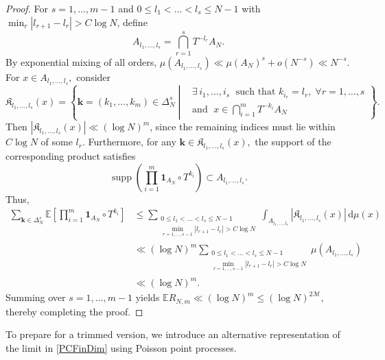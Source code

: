 \documentclass[11pt,twoside,a4paper,reqno]{amsart}
\newcommand{\supp}{\operatorname{supp}}
\renewcommand{\d}{\, \text{d}}
\newcommand{\E}{\mathbb{E}}
\def\one{{\mathbf{1}}}
\begin{document}
\begin{proof}
For $s = 1, \dots, m-1$ and $0\leq l_1 < \dots < l_s \leq N-1$ with $\min_r |l_{r+1}-l_r| > C\log N$, define
$$
A_{l_1,\dots,l_s} = \bigcap_{r=1}^s T^{-l_r} A_N.
$$
By exponential mixing of all orders, $\mu(A_{l_1,\dots,l_s})\ll
\mu(A_N)^s+o(N^{-s}) \ll N^{-s}$. For $x\in A_{l_1,\dots,l_s},$ consider
\begin{equation*}
\mathfrak{K}_{l_1,\dots,l_s}(x)=\left\{\mathbf{k}=(k_1,\dots,k_m)\in \Delta_N^s\;\left|
\begin{aligned}
&\exists\, i_1,\dots,i_s\; \text{ such that } k_{i_r}=l_r, \; \forall r=1,\dots,s \\
&\text{and }\; x\in \bigcap_{i=1}^m T^{-k_i} A_N
\end{aligned} \right\} \right. .
\end{equation*}
Then $|\mathfrak{K}_{l_1,\dots,l_s}(x)| \ll (\log N)^m$, since the remaining indices must lie within $C \log N$ of some $l_r$. Furthermore, for any $\mathbf{k} \in \mathfrak{K}_{l_1,\dots,l_s}(x),$ the support of the corresponding product satisfies
$$
\supp\left(\prod_{i=1}^{m} \one_{A_N}\circ T^{k_i}\right) \subset A_{l_1,\dots,l_s}.
$$
Thus,
\begin{align*}
\sum_{\mathbf{k} \in \Delta_N^s} \E \left[ \prod_{i=1}^m \one_{A_N} \circ T^{k_i} \right] & \leq
\sum_{\substack{0\leq l_1<\ldots<l_s\leq N-1\\ \min_{r=1,\ldots,s-1} |l_{r+1}-l_r|>C\log N}}
\int_{A_{l_1,\ldots,l_s}} |\mathfrak{K}_{l_1,\ldots,l_s}(x)| \d\mu(x)\\
& \ll (\log N)^m \sum_{\substack{0\leq l_1<\ldots<l_s\leq N-1\\ \min_{r=1,\ldots,s-1} |l_{r+1}-l_r|>C\log N}} \mu(A_{l_1,\ldots,l_s})\\
&\ll (\log N)^m.
\end{align*}
Summing over $s = 1, \dots, m-1$ yields $\E R_{N,m} \ll (\log N)^m \leq (\log N)^{2\mathcal{M}},$ thereby completing the proof.
\end{proof}




To prepare for a trimmed version, we introduce an alternative representation of the limit in \eqref{PCFinDim} using Poisson point processes.
\end{document}
